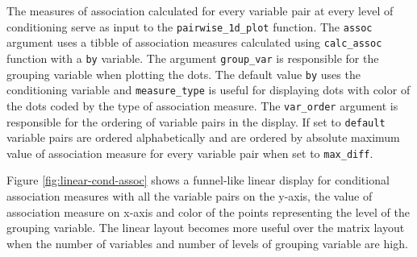 The measures of association calculated for every variable pair at every
level of conditioning serve as input to the \texttt{pairwise\_1d\_plot}
function. The \texttt{assoc} argument uses a tibble of association
measures calculated using \texttt{calc\_assoc} function with a
\texttt{by} variable. The argument \texttt{group\_var} is responsible
for the grouping variable when plotting the dots. The default value
\texttt{by} uses the conditioning variable and \texttt{measure\_type} is
useful for displaying dots with color of the dots coded by the type of
association measure. The \texttt{var\_order} argument is responsible for
the ordering of variable pairs in the display. If set to
\texttt{default} variable pairs are ordered alphabetically and are
ordered by absolute maximum value of association measure for every
variable pair when set to \texttt{max\_diff}.

Figure \ref{fig:linear-cond-assoc} shows a funnel-like linear display
for conditional association measures with all the variable pairs on the
y-axis, the value of association measure on x-axis and color of the
points representing the level of the grouping variable. The linear
layout becomes more useful over the matrix layout when the number of
variables and number of levels of grouping variable are high.

